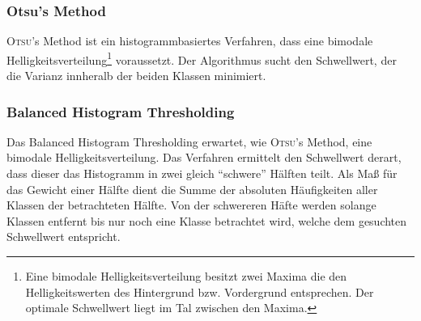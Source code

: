 
\subsubsection*{Otsu's Method}
\textsc{Otsu}'s Method ist ein histogrammbasiertes Verfahren, dass eine bimodale Helligkeitsverteilung\footnote{Eine bimodale Helligkeitsverteilung besitzt zwei Maxima die den Helligkeitswerten des Hintergrund bzw. Vordergrund entsprechen. Der optimale Schwellwert liegt im Tal zwischen den Maxima.} voraussetzt.
Der Algorithmus sucht den Schwellwert, der die Varianz innheralb der beiden Klassen minimiert.

\subsubsection*{Balanced Histogram Thresholding}
Das Balanced Histogram Thresholding erwartet, wie \textsc{Otsu}'s Method, eine bimodale Helligkeitsverteilung.
Das Verfahren ermittelt den Schwellwert derart, dass dieser das Histogramm in zwei gleich "`schwere"' Hälften teilt.
Als Maß für das Gewicht einer Hälfte dient die Summe der absoluten Häufigkeiten aller Klassen der betrachteten Hälfte.
Von der schwereren Häfte werden solange Klassen entfernt bis nur noch eine Klasse betrachtet wird, welche dem gesuchten Schwellwert entspricht.
